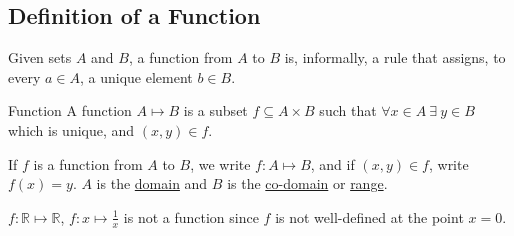 \documentclass[../Main.tex]{subfiles}
\begin{document}
\subsection{Definition of a Function}
Given sets $A$ and $B$, a function from $A$ to $B$ is, informally, a rule that assigns, to every $a \in A$, a unique element $b \in B$.
\begin{definition}{Function}
    A function $A \mapsto B$ is a subset $f \subseteq A \times B$ such that $\forall x \in A~\exists~y \in B$ which is unique, and $(x, y) \in f$.
\end{definition}
If $f$ is a function from $A$ to $B$, we write $f : A \mapsto B$, and if $(x, y) \in f$, write $f(x) = y$. $A$ is the \underline{domain} and $B$ is the \underline{co-domain} or \underline{range}.
\begin{example}
    $f : \mathbb{R} \mapsto \mathbb{R}$, $f : x \mapsto \frac{1}{x}$ is not a function since $f$ is not well-defined at the point $x=0$.
\end{example}
\end{document}
